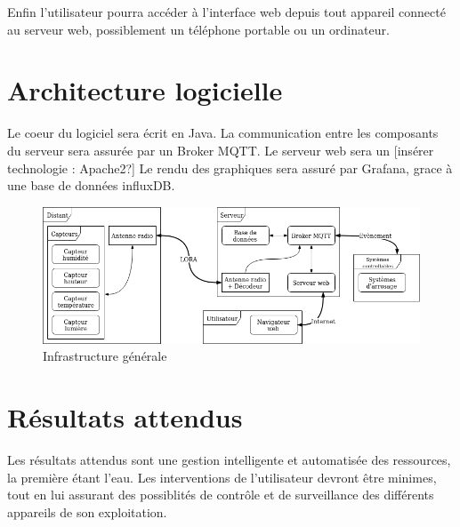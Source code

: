 \documentclass[11pt,a4paper]{article}
\begin{document}
Enfin l'utilisateur pourra accéder à l'interface web depuis tout appareil connecté au serveur web, possiblement un téléphone portable ou un ordinateur.

\section{Architecture logicielle}
Le coeur du logiciel sera écrit en Java.
La communication entre les composants du serveur sera assurée par un Broker MQTT.
Le serveur web sera un  [insérer technologie : Apache2?]
Le rendu des graphiques sera assuré par Grafana, grace à une base de données influxDB.

\begin{figure}
	\begin{centering}
	\includegraphics[scale=0.5]{graph.png}
	\end{centering}
	\caption{Infrastructure générale}
\end{figure}

\section{Résultats attendus}

Les résultats attendus sont une gestion intelligente et automatisée des ressources, la première étant l'eau.
Les interventions de l'utilisateur devront être minimes, tout en lui assurant des possiblités de contrôle et de surveillance des différents appareils de son exploitation.
\end{document}
